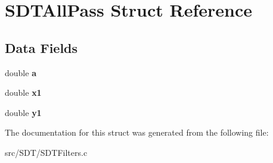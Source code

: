 \hypertarget{struct_s_d_t_all_pass}{}\section{S\+D\+T\+All\+Pass Struct Reference}
\label{struct_s_d_t_all_pass}
\subsection*{Data Fields}
\begin{DoxyCompactItemize}
\item 
\hypertarget{struct_s_d_t_all_pass_a1031d0e0a97a340abfe0a6ab9e831045}{}double {\bfseries a}\label{struct_s_d_t_all_pass_a1031d0e0a97a340abfe0a6ab9e831045}

\item 
\hypertarget{struct_s_d_t_all_pass_ac75b803b570527306e1e744bfb7a604f}{}double {\bfseries x1}\label{struct_s_d_t_all_pass_ac75b803b570527306e1e744bfb7a604f}

\item 
\hypertarget{struct_s_d_t_all_pass_ac3b72e5b77595ca2340ecf8ccfe5fd99}{}double {\bfseries y1}\label{struct_s_d_t_all_pass_ac3b72e5b77595ca2340ecf8ccfe5fd99}

\end{DoxyCompactItemize}


The documentation for this struct was generated from the following file\+:\begin{DoxyCompactItemize}
\item 
src/\+S\+D\+T/S\+D\+T\+Filters.\+c\end{DoxyCompactItemize}

